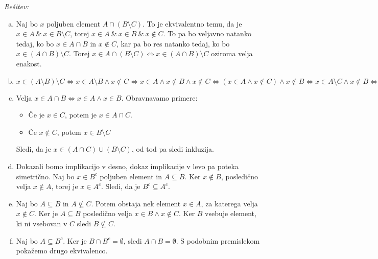 \documentclass[a4paper, 10pt]{article}
\newenvironment{resitev}{\begin{flushleft}\textit{Rešitev:}}{\hfill\end{flushleft}}
\begin{document}
	\begin{resitev}
		\begin{enumerate}[a)]
			\item Naj bo $x$ poljuben element $A\cap (B\setminus C)$. To je ekvivalentno temu, da je $x\in A~\&~x\in B \setminus C$, torej $x\in A~\&~x\in B~\&~x\notin C$. To pa bo veljavno natanko tedaj, ko bo $x\in A\cap B$ in $x\notin C$, kar pa bo res natanko tedaj, ko bo $x\in (A\cap B)\setminus C$. Torej $x\in A\cap (B\setminus C) \iff x\in (A\cap B)\setminus C$ oziroma velja enakost.
			\item $x\in (A\setminus B)\setminus C \iff x\in A\setminus B \land x\notin C \iff x\in A \land x\notin B \land x\notin C \iff (x\in A \land x\notin C) \land x\notin B \iff x\in A\setminus C \land x\notin B \iff x \in (A\setminus C)\setminus B$
			\item Velja $x\in A\cap B \iff x\in A \land x\in B$. Obravnavamo primere: \begin{itemize}
				\item Če je $x\in C$, potem je $x\in A\cap C$.
				\item Če $x\notin C$, potem $x\in B\setminus C$
			\end{itemize}
			Sledi, da je $x\in (A\cap C)\cup (B\setminus C)$, od tod pa sledi inkluzija.
			\item Dokazali bomo implikacijo v desno, dokaz implikacije v levo pa poteka simetrično. Naj bo $x\in B^c$ poljuben element in $A\subseteq B$. Ker $x\notin B$, posledično velja $x\notin A$, torej je $x\in A^c$. Sledi, da je $B^c \subseteq A^c$.
			\item Naj bo $A\subseteq B$ in $A\nsubseteq C$. Potem obstaja nek element $x\in A$, za katerega velja $x\notin C$. Ker je $A\subseteq B$ posledično velja $x\in B \land x\notin C$. Ker $B$ vsebuje element, ki ni vsebovan v $C$ sledi $B\nsubseteq C$.
			\item Naj bo $A\subseteq B^c$. Ker je $B\cap B^c = \emptyset$, sledi $A\cap B = \emptyset$. S podobnim premislekom pokažemo drugo ekvivalenco.
		\end{enumerate}
	\end{resitev}
\end{document}
